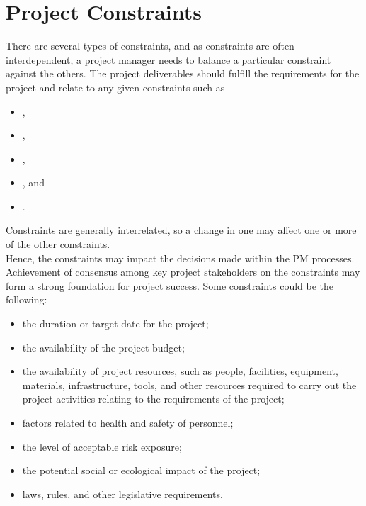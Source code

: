 \documentclass[letterpaper,10pt,english]{jupyterBook}
\begin{document}
\section{Project Constraints}
\label{\detokenize{PM/pm-concepts:project-constraints}}
\sphinxAtStartPar
There are several types of constraints, and as constraints are often interdependent, a project manager needs to balance a particular constraint against the others.
The project deliverables should fulfill the requirements for the project and relate to any given constraints such as
\begin{itemize}
\item {} 
\sphinxAtStartPar
{},

\item {} 
\sphinxAtStartPar
{},

\item {} 
\sphinxAtStartPar
{},

\item {} 
\sphinxAtStartPar
{}, and

\item {} 
\sphinxAtStartPar
{}.

\end{itemize}

\sphinxAtStartPar
Constraints are generally interrelated, so a change in one may affect one or more of the other constraints. \\
Hence, the constraints may impact the decisions made within the PM processes. \\
Achievement of consensus among key project stakeholders on the constraints may form a strong foundation for project success.
Some constraints could be the following:
\begin{itemize}
\item {} 
\sphinxAtStartPar
the duration or target date for the project;

\item {} 
\sphinxAtStartPar
the availability of the project budget;

\item {} 
\sphinxAtStartPar
the availability of project resources, such as people, facilities, equipment, materials, infrastructure, tools, and other resources required to carry out the project activities relating to the requirements of the project;

\item {} 
\sphinxAtStartPar
factors related to health and safety of personnel;

\item {} 
\sphinxAtStartPar
the level of acceptable risk exposure;

\item {} 
\sphinxAtStartPar
the potential social or ecological impact of the project;

\item {} 
\sphinxAtStartPar
laws, rules, and other legislative requirements.

\end{itemize}
\end{document}
